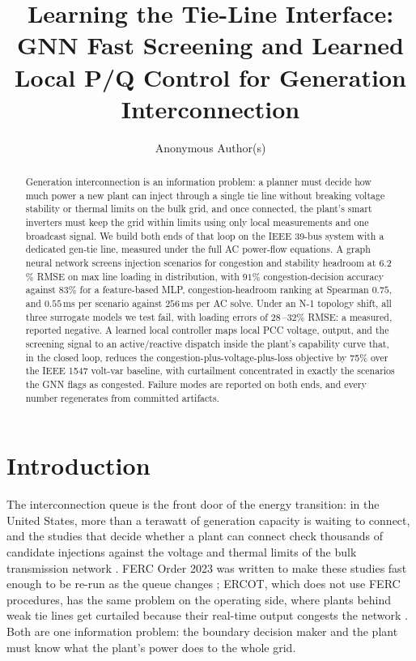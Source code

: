 \documentclass{article}
\title{Learning the Tie-Line Interface: GNN Fast Screening and Learned Local P/Q Control for Generation Interconnection}
\author{%
  Anonymous Author(s)\\  %
}
\newcommand{\citep}[1]{\cite{#1}}
\begin{document}
\maketitle

\begin{abstract}
Generation interconnection is an information problem: a planner must decide
how much power a new plant can inject through a single tie line without
breaking voltage stability or thermal limits on the bulk grid, and once
connected, the plant's smart inverters must keep the grid within limits using
only local measurements and one broadcast signal. We build both ends of that
loop on the IEEE 39-bus system with a dedicated gen-tie line, measured under
the full AC power-flow equations. A graph neural network screens injection
scenarios for congestion and stability headroom at $6.2$\% RMSE on max line
loading in distribution, with $91$\% congestion-decision accuracy against
$83$\% for a feature-based MLP, congestion-headroom ranking at Spearman
$0.75$, and $0.55$\,ms per scenario against $256$\,ms per AC solve. Under
an N-1 topology shift, all three surrogate models we test fail, with loading
errors of $28$\,--$32$\% RMSE: a measured, reported negative. A learned local
controller maps local PCC voltage, output, and the screening signal to an
active/reactive dispatch inside the plant's capability curve that, in the
closed loop, reduces the congestion-plus-voltage-plus-loss objective by
75\% over the IEEE 1547 volt-var baseline, with curtailment
concentrated in exactly the scenarios the GNN flags as congested. Failure
modes are reported on both ends, and every number regenerates from
committed artifacts.
\end{abstract}

\section{Introduction}

The interconnection queue is the front door of the energy transition: in the
United States, more than a terawatt of generation capacity is waiting to
connect, and the studies that decide whether a plant can connect check
thousands of candidate injections against the voltage and thermal limits of
the bulk transmission network \citep{gorman2025grid}. FERC Order 2023 was
written to make these studies fast enough to be re-run as the queue changes
\citep{ferc2023order}; ERCOT, which does not use FERC procedures, has the
same problem on the operating side, where plants behind weak tie lines get
curtailed because their real-time output congests the network
\citep{gorman2025grid,ercot2024reports}. Both are one information
problem: the boundary decision maker and the plant must know what the
plant's power does to the whole grid.
\end{document}
